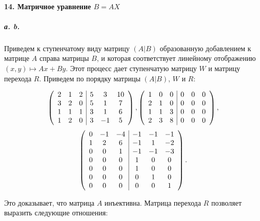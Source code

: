 \documentclass{mai_book}
\begin{document}
{\paragraph{14. Матричное уравнение $B = AX$}

\subparagraph{а. b.} Приведем к ступенчатому виду матрицу $(A | B)$ образованную добавлением к матрице $A$ справа матрицы $B$, и которая соответствует линейному отображению $(x, y) \mapsto Ax+By$. Этот процесс дает ступенчатую матрицу $W$ и матрицу перехода $R$. Приведем по порядку матрицы
$(A | B)$, $W$ и $R$:

\[ \left( \begin{array}{cccccc}
2 & 1 & 2 & \multicolumn{1}{|c}{5} & 3 & 10 \\
3 & 2 & 0 & \multicolumn{1}{|c}{5} & 1 & 7 \\
1 & 1 & 1 & \multicolumn{1}{|c}{3} & 1 & 6 \\
1 & 2 & 0 & \multicolumn{1}{|c}{3} & -1 & 5
\end{array} \right),
\left( \begin{array}{cccccc}
1 & 0 & 0 & \multicolumn{1}{|c}{0} & 0 & 0 \\
2 & 1 & 0 & \multicolumn{1}{|c}{0} & 0 & 0 \\
1 & 1 & 3 & \multicolumn{1}{|c}{0} & 0 & 0 \\
2 & 3 & 8 & \multicolumn{1}{|c}{0} & 0 & 0
\end{array} \right),\]
\[
\left( \begin{array}{cccccc}
0 & -1 & -4 & \multicolumn{1}{|c}{-1} & -1 & -1 \\
1 & 2 & 6 & \multicolumn{1}{|c}{-1} & 1 & -2 \\
0 & 0 & 1 & \multicolumn{1}{|c}{-1} & -1 & -3 \\
0 & 0 & 0 & \multicolumn{1}{|c}{1} & 0 & 0 \\
0 & 0 & 0 & \multicolumn{1}{|c}{1} & 0 & 0 \\
0 & 0 & 0 & \multicolumn{1}{|c}{0} & 1 & 0 \\
0 & 0 & 0 & \multicolumn{1}{|c}{0} & 0 & 1
\end{array} \right). \]

\noindent Это доказывает, что матрица $A$ инъективна. Матрица перехода $R$ позволяет выразить следующие отношения:

}
\end{document}
